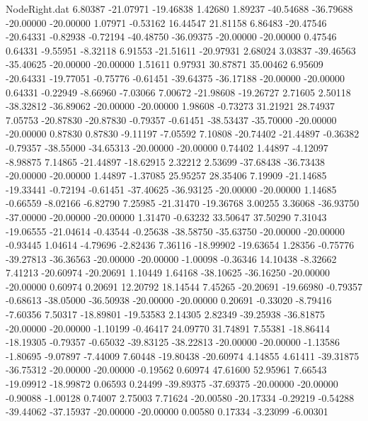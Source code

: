 \begin{filecontents}{NodeRight.dat}
   6.80387  -21.07971  -19.46838     1.42680    1.89237  -40.54688  -36.79688  -20.00000  -20.00000    1.07971   -0.53162   16.44547   21.81158
   6.86483  -20.47546  -20.64331    -0.82938   -0.72194  -40.48750  -36.09375  -20.00000  -20.00000    0.47546    0.64331   -9.55951   -8.32118
   6.91553  -21.51611  -20.97931     2.68024    3.03837  -39.46563  -35.40625  -20.00000  -20.00000    1.51611    0.97931   30.87871   35.00462
   6.95609  -20.64331  -19.77051    -0.75776   -0.61451  -39.64375  -36.17188  -20.00000  -20.00000    0.64331   -0.22949   -8.66960   -7.03066
   7.00672  -21.98608  -19.26727     2.71605    2.50118  -38.32812  -36.89062  -20.00000  -20.00000    1.98608   -0.73273   31.21921   28.74937
   7.05753  -20.87830  -20.87830    -0.79357   -0.61451  -38.53437  -35.70000  -20.00000  -20.00000    0.87830    0.87830   -9.11197   -7.05592
   7.10808  -20.74402  -21.44897    -0.36382   -0.79357  -38.55000  -34.65313  -20.00000  -20.00000    0.74402    1.44897   -4.12097   -8.98875
   7.14865  -21.44897  -18.62915     2.32212    2.53699  -37.68438  -36.73438  -20.00000  -20.00000    1.44897   -1.37085   25.95257   28.35406
   7.19909  -21.14685  -19.33441    -0.72194   -0.61451  -37.40625  -36.93125  -20.00000  -20.00000    1.14685   -0.66559   -8.02166   -6.82790
   7.25985  -21.31470  -19.36768     3.00255    3.36068  -36.93750  -37.00000  -20.00000  -20.00000    1.31470   -0.63232   33.50647   37.50290
   7.31043  -19.06555  -21.04614    -0.43544   -0.25638  -38.58750  -35.63750  -20.00000  -20.00000   -0.93445    1.04614   -4.79696   -2.82436
   7.36116  -18.99902  -19.63654     1.28356   -0.75776  -39.27813  -36.36563  -20.00000  -20.00000   -1.00098   -0.36346   14.10438   -8.32662
   7.41213  -20.60974  -20.20691     1.10449    1.64168  -38.10625  -36.16250  -20.00000  -20.00000    0.60974    0.20691   12.20792   18.14544
   7.45265  -20.20691  -19.66980    -0.79357   -0.68613  -38.05000  -36.50938  -20.00000  -20.00000    0.20691   -0.33020   -8.79416   -7.60356
   7.50317  -18.89801  -19.53583     2.14305    2.82349  -39.25938  -36.81875  -20.00000  -20.00000   -1.10199   -0.46417   24.09770   31.74891
   7.55381  -18.86414  -18.19305    -0.79357   -0.65032  -39.83125  -38.22813  -20.00000  -20.00000   -1.13586   -1.80695   -9.07897   -7.44009
   7.60448  -19.80438  -20.60974     4.14855    4.61411  -39.31875  -36.75312  -20.00000  -20.00000   -0.19562    0.60974   47.61600   52.95961
   7.66543  -19.09912  -18.99872     0.06593    0.24499  -39.89375  -37.69375  -20.00000  -20.00000   -0.90088   -1.00128    0.74007    2.75003
   7.71624  -20.00580  -20.17334    -0.29219   -0.54288  -39.44062  -37.15937  -20.00000  -20.00000    0.00580    0.17334   -3.23099   -6.00301

\end{filecontents}
